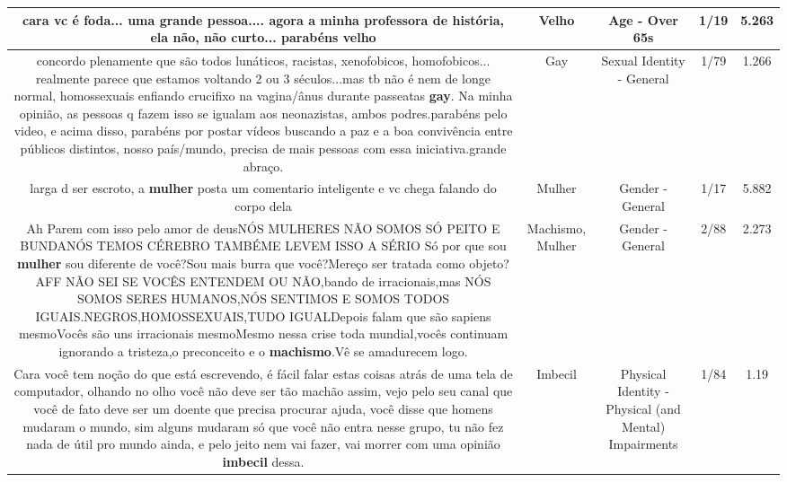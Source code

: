 \documentclass[11pt]{article}
\newlength\mylength
\begin{document}
\begin{center}
\begin{longtable}{|C{.65\mylength}|C{.30\mylength}|C{.12\mylength}|C{.12\mylength}|C{.12\mylength}|}
  \small cara vc é foda... uma grande pessoa.... agora a minha professora de história, ela não, não curto... parabéns velho\normalsize   & Velho & Age - Over 65s & 1/19 & 5.263 \\  \hline
  \small concordo plenamente que são todos lunáticos, racistas, xenofobicos, homofobicos... realmente parece que estamos voltando 2 ou 3 séculos...mas tb não é nem de longe normal, homossexuais enfiando crucifixo na vagina/ânus durante passeatas \textbf{gay}. Na minha opinião, as pessoas q fazem isso se igualam aos neonazistas, ambos podres.parabéns pelo video, e acima disso, parabéns por postar vídeos buscando a paz e a boa convivência entre públicos distintos, nosso país/mundo, precisa de mais pessoas com essa iniciativa.grande abraço.\normalsize   & Gay & Sexual Identity - General & 1/79 & 1.266 \\  \hline
  \small larga d ser escroto, a \textbf{mulher} posta um comentario inteligente e vc chega falando do corpo dela\normalsize   & Mulher & Gender - General & 1/17 & 5.882 \\  \hline
  \small Ah Parem com isso pelo amor de deusNÓS MULHERES NÃO SOMOS SÓ PEITO E BUNDANÓS TEMOS CÉREBRO TAMBÉME LEVEM ISSO A SÉRIO Só por que sou \textbf{mulher} sou diferente de você?Sou mais burra que você?Mereço ser tratada como objeto?AFF NÃO SEI SE VOCÊS ENTENDEM OU NÃO,bando de irracionais,mas NÓS SOMOS SERES HUMANOS,NÓS SENTIMOS E SOMOS TODOS IGUAIS.NEGROS,HOMOSSEXUAIS,TUDO IGUALDepois falam que são sapiens mesmoVocês são uns irracionais mesmoMesmo nessa crise toda mundial,vocês continuam ignorando a tristeza,o preconceito e o \textbf{machismo}.Vê se amadurecem logo.\normalsize   & Machismo, Mulher & Gender - General & 2/88 & 2.273 \\  \hline
  \small Cara você tem noção do que está escrevendo, é fácil falar estas coisas atrás de uma tela de computador, olhando no olho você não deve ser tão machão assim, vejo pelo seu canal que você de fato deve ser um doente que precisa procurar ajuda, você disse que homens mudaram o mundo, sim alguns mudaram só que você não entra nesse grupo, tu não fez nada de útil pro mundo ainda, e pelo jeito nem vai fazer, vai morrer com uma opinião \textbf{imbecil} dessa.\normalsize   & Imbecil & Physical Identity - Physical (and Mental) Impairments & 1/84 & 1.19 \\  \hline

\end{longtable}
\end{center}
\end{document}
